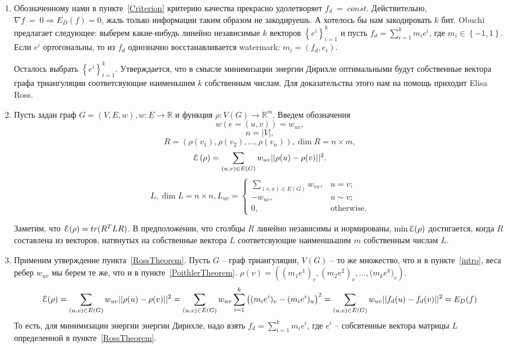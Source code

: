 \documentclass{article}
\begin{document}
\begin{enumerate}
    \item Обозначенному нами в пункте~\ref{Criterion} критерию качества прекрасно удолетворяет $f_d~=~const$. 
    Действительно, $\nabla{f}~=~0 \Rightarrow E_D(f) = 0$, жаль только информации таким образом не закодируешь. А хотелось бы нам закодировать $k$ бит.
    Obuchi предлагает следующее: выберем какие-нибудь линейно независимые $k$ векторов $\left\{ e^i \right\}_{i=1}^k$ и пусть $f_d = \sum_{i=1}^{k}{m_i e^i}$,
    где $m_i \in \left\{ -1, 1 \right\}$. Если $e^i$ ортогональны, то из $f_d$ однозначно восстанавливается watermark: $m_i = (f_d, e_i)$.

    Осталось выбрать $\left\{ e^i \right\}_{i=1}^k$. Утверждается, что в смысле минимизации энергии Дирихле оптимальными будут собственные вектора графа триангуляции соответсвующие наименьшим $k$ собственным числам. Для доказательства этого нам на помощь приходит Elisa Ross.
    
    \item \label{RossTheorem}
    Пусть задан граф $G = (V, E, w), w: E \to \mathbb{R}$ и функция $\rho: V(G) \to \mathbb{R}^m$. Введем обозначения 
    $$ w(e = (u, v)) = w_{uv},$$
    $$ n = |V|, $$
    $$ R = \left(\rho(v_1), \rho(v_2), ... , \rho(v_n)\right), \dim{R} = n \times m, $$
    $$ \EuScript{E}\left(\rho\right) = \sum_{\left(u, v \right) \in E\left( G \right)}{w_{uv} ||\rho(u) - \rho(v)||^2}.$$
    $$ L, \dim{L} = n \times n, L_{uv} = \begin{cases}
        \sum_{(v, x) \in E(G)}{w_{vx}},&\text{$u = v;$} \\
        -w_{uv},&\text{$u \sim v;$} \\
        0, &\text{otherwise.}
    \end{cases}
    $$
    
    Заметим, что $\EuScript{E}(\rho) = tr(R^T L R)$. В предположении, что столбцы $R$ линейно независимы и нормированы, $\min{\EuScript{E}(\rho)}$ достигается, 
    когда $R$ составлена из векторов, натянутых на собственные вектора $L$ соответсвующие наименшьшим $m$ собственным числам $L$.
     
    \item Применим утверждение пункта~\ref{RossTheorem}. Пусть $G$ -- граф триангуляции, $V(G)$ -- то же множество, что и в пункте~\ref{intro}, 
    веса ребер $w_{uv}$ мы берем те же, что и в пункте~\ref{PoithlerTheorem}. $\rho(v) = \left( {(m_1 e^1)_v}, {(m_2 e^2)_v}, ..., {(m_k e^k})_v \right)$.
    $$
        \EuScript{E}(\rho) = \sum_{\left( u, v \right) \in E \left( G \right)}{w_{uv} ||\rho(u) - \rho(v)||^2} = 
        \sum_{\left( u, v \right) \in E \left( G \right)}{w_{uv} \sum_{i=1}^k{\left((m_i e^i)_v - (m_i e^i)_u \right)^2}} =
        \sum_{\left( u, v \right) \in E \left( G \right)}{w_{uv} ||f_d(u) - f_d(v)||^2} = E_D(f)
    $$
    То есть, для минимизации энергии энергии Дирихле, надо взять $f_d = \sum_{i=1}^k{m_i e^i}$, где $e^i$ -- собсвтенные вектора матрицы $L$ определенной 
    в пункте~\ref{RossTheorem}.
\end{enumerate}
\end{document}
